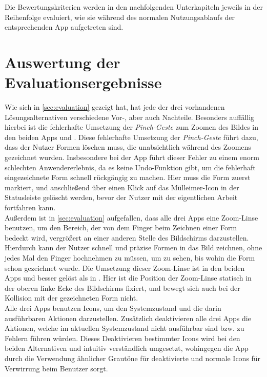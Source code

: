 Die Bewertungskriterien werden in den nachfolgenden Unterkapiteln jeweils in der Reihenfolge evaluiert, wie sie während des normalen Nutzungsablaufs der entsprechenden App aufgetreten sind.




\section{Auswertung der Evaluationsergebnisse}


Wie sich in \autoref{sec:evaluation} gezeigt hat, hat jede der drei vorhandenen Lösungsalternativen verschiedene Vor-, aber auch Nachteile.
Besonders auffällig hierbei ist die fehlerhafte Umsetzung der \emph{Pinch-Geste} zum Zoomen des Bildes in den beiden Apps \mm{} und \pm{}.
Diese fehlerhafte Umsetzung der \emph{Pinch-Geste} führt dazu, dass der Nutzer Formen löschen muss, die unabsichtlich während des Zoomens gezeichnet wurden.
Insbesondere bei der App \pm{} führt dieser Fehler zu einem enorm schlechten Anwendererlebnis, da es keine Undo-Funktion gibt, um die fehlerhaft eingezeichnete Form schnell rückgängig zu machen.
Hier muss die Form zuerst markiert, und anschließend über einen Klick auf das Mülleimer-Icon in der Statusleiste gelöscht werden, bevor der Nutzer mit der eigentlichen Arbeit fortfahren kann. \\

Außerdem ist in \autoref{sec:evaluation} aufgefallen, dass alle drei Apps eine Zoom-Linse benutzen, um den Bereich, der von dem Finger beim Zeichnen einer Form bedeckt wird, vergrößert an einer anderen Stelle des Bildschirms darzustellen.
Hierdurch kann der Nutzer schnell und präzise Formen in das Bild zeichnen, ohne jedes Mal den Finger hochnehmen zu müssen, um zu sehen, bis wohin die Form schon gezeichnet wurde.
Die Umsetzung dieser Zoom-Linse ist in den beiden Apps \mm{} und \pm{} besser gelöst als in \im{}.
Hier ist die Position der Zoom-Linse statisch in der oberen linke Ecke des Bildschirms fixiert, und bewegt sich auch bei der Kollision mit der gezeichneten Form nicht. \\

Alle drei Apps benutzen Icons, um den Systemzustand und die darin ausführbaren Aktionen darzustellen.
Zusätzlich deaktivieren alle drei Apps die Aktionen, welche im aktuellen Systemzustand nicht ausführbar sind bzw. zu Fehlern führen würden.
Dieses Deaktivieren bestimmter Icons wird bei den beiden Alternativen \mm{} und \pm{} intuitiv verständlich umgesetzt, wohingegen die App \im{} durch die Verwendung ähnlicher Grautöne für deaktivierte und normale Icons für Verwirrung beim Benutzer sorgt. \\

